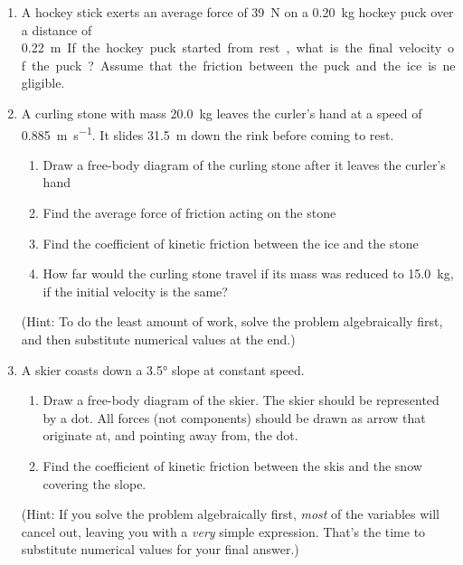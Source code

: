 \begin{enumerate}[itemsep=4pt]
%  
%  

\item A hockey stick exerts an average force of \SI{39}{\newton} on a
  \SI{.20}{\kilo\gram} hockey puck over a distance of \SI{.22}\metre. If the
  hockey puck started from rest, what is the final velocity of the puck? 
  Assume that the friction between the puck and the ice is negligible. 

\item A curling stone with mass \SI{20.0}{\kilo\gram} leaves the curler's hand
  at a speed of \SI{.885}{\metre\per\second}. It slides \SI{31.5}{\metre} down
  the rink before coming to rest. 
  \begin{enumerate}[itemsep=4pt]
  \item Draw a free-body diagram of the curling stone after it leaves the
    curler's hand
  \item Find the average force of friction acting on the stone
  \item Find the coefficient of kinetic friction between the ice and the stone
  \item How far would the curling stone travel if its mass was reduced to
    \SI{15.0}{\kilo\gram}, if the initial velocity is the same?
  \end{enumerate}
  (Hint: To do the least amount of work, solve the problem algebraically first,
  and then substitute numerical values at the end.)

\item A skier coasts down a \ang{3.5} slope at constant speed.
  \begin{enumerate}[itemsep=4pt]
    \item Draw a free-body diagram of the skier. The skier should be
    represented by a dot. All forces (not components) should be drawn as arrow
    that originate at, and pointing away from, the dot.
    \item Find the coefficient of kinetic friction between the skis and the snow
    covering the slope.
  \end{enumerate}
  (Hint: If you solve the problem algebraically first, \emph{most} of the
  variables will cancel out, leaving you with a \emph{very} simple expression.
  That's the time to substitute numerical values for your final answer.)


\end{enumerate}
